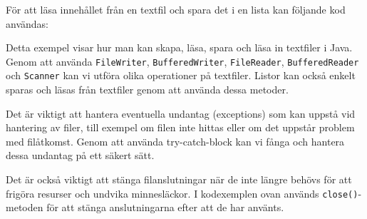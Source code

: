 För att läsa innehållet från en textfil och spara det i en lista kan
följande kod användas:

\hypertarget{cb4}{}
\begin{Shaded}
\begin{Highlighting}[]
\OperatorTok{\textless{}}\OperatorTok{\textgreater{}}\OperatorTok{=}  \OperatorTok{\textless{}\textgreater{}();}

 \OperatorTok{\{}
    \OperatorTok{=}  \OperatorTok{(}\OperatorTok{);}
    \OperatorTok{=}  \OperatorTok{(}\OperatorTok{);}
     \OperatorTok{(}\OperatorTok{())} \OperatorTok{\{}
        \OperatorTok{=}\OperatorTok{();}
\OperatorTok{(}\OperatorTok{);}
    \OperatorTok{\}}
\OperatorTok{();}
\OperatorTok{\}}  \OperatorTok{(}\OperatorTok{)} \OperatorTok{\{}
    \OperatorTok{(}\OperatorTok{);}
\OperatorTok{\}}
\end{Highlighting}
\end{Shaded}

Detta exempel visar hur man kan skapa, läsa, spara och läsa in textfiler
i Java. Genom att använda \texttt{FileWriter}, \texttt{BufferedWriter},
\texttt{FileReader}, \texttt{BufferedReader} och \texttt{Scanner} kan vi
utföra olika operationer på textfiler. Listor kan också enkelt sparas
och läsas från textfiler genom att använda dessa metoder.

Det är viktigt att hantera eventuella undantag (exceptions) som kan
uppstå vid hantering av filer, till exempel om filen inte hittas eller
om det uppstår problem med filåtkomst. Genom att använda try-catch-block
kan vi fånga och hantera dessa undantag på ett säkert sätt.

Det är också viktigt att stänga filanslutningar när de inte längre
behövs för att frigöra resurser och undvika minnesläckor. I kodexemplen
ovan används \texttt{close()}-metoden för att stänga anslutningarna
efter att de har använts.

